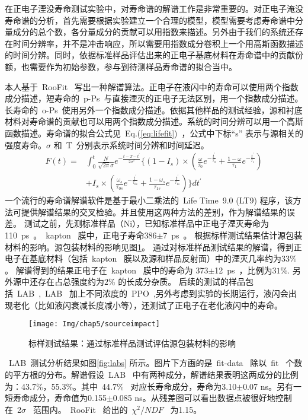 在正电子湮没寿命测试实验中，对寿命谱的解谱工作是非常重要的。对正电子淹没寿命谱的分析，首先需要根据实验建立一个合理的模型，模型需要考虑寿命谱中分量成分的总个数，各分量成分的贡献可以用指数来描述。另外由于我们的系统还存在时间分辨率，并不是冲击响应，所以需要用指数成分卷积上一个用高斯函数描述的时间分辨。同时，依据标准样品评估出来的正电子基底材料在寿命谱中的贡献份额，也需要作为初始参数，参与到待测样品寿命谱的拟合当中。

本人基于~RooFit~ 写出一种解谱算法。正电子在液闪中的寿命可以使用两个指数成分描述，短寿命的~p-Ps~与直接湮灭的正电子无法区别，用一个指数成分描述。长寿命的~o-Ps~使用另外一个指数成分描述。依据其他样品的测试经验，源和衬底材料对寿命谱的贡献也可以用两个指数成分描述。系统的时间分辨可以用一个高斯函数描述。寿命谱的拟合公式见~Eq.(\ref{eq:lifefit})~，公式中下标``s'' 表示与源相关的强度寿命。$\sigma$ 和~T~分别表示系统时间分辨和时间延迟。
\begin{eqnarray}
\label{eq:lifefit}
 F(t)=&\int_{0}^{t}\frac{N}{\sqrt{2\pi}\sigma}e^{-\frac{t-T-t^{\prime}}{2\sigma^2}}
\Big\{
     (1-I_s)\times (
    \frac{\omega}{\tau_{0}}e^{-\frac{t^{\prime}}{\tau_{0}}}+
    \frac{1-\omega}{\tau_{1}}e^{-\frac{t^{\prime}}{\tau_{1}}}
     )
 \nonumber \\
      &+I_s \times (
    \frac{\omega_s}{\tau_{0s}}e^{-\frac{t^{\prime}}{\tau_{0s}}}+
    \frac{1-\omega_s}{\tau_{1s}}e^{-\frac{t^{\prime}}{\tau_{1s}}}
     )
 \Big\}
 dt^{\prime}
\end{eqnarray}
一个流行的寿命谱解谱软件是基于最小二乘法的~Life Time~9.0 (LT9) 程序\citep{kansy1996microcomputer}，该方法可提供解谱结果的交叉检验。并且使用这两种方法的差别，作为解谱结果的误差。
测试之前，先测标准样品（Ni），已知标准样品中正电子湮灭寿命为110~ps~\citep{zhang2015accurate}。~kapton~ 膜中，正电子寿命386$\pm$7~ps~\citep{plotkowski1988positron}。 根据标样测试结果估计源包装材料的影响。源包装材料的影响见图\ref{fig:p55}。 通过对标准样品测试结果的解谱，得到正电子在基底材料（包括~kapton~ 膜以及源和样品反射面）中的湮灭几率约为$33\%$。 解谱得到的结果正电子在~kapton~ 膜中的寿命为 373$\pm$12~ps~，比例为$31\%$. 另外源中还存在占总强度约为$2\%$ 的长成分杂质。
后续的测试的样品包括~LAB~,~LAB~ 加上不同浓度的~PPO~,另外考虑到实验的长期运行，液闪会出现老化（比如液闪衰减长度减小等），还测试了正电子在老化液闪中的寿命。
\begin{figure}[!htbp]
  \centering
   \texttt{[image: Img/chap5/sourceimpact]}
    \caption{标样测试结果：通过标准样品测试评估源包装材料的影响}
  \label{fig:p55}
\end{figure}
~LAB~测试分析结果如图\ref{fig:labs} 所示。图片下方画的是~fit-data~ 除以~fit~ 个数的平方根的分布。解谱假设~LAB~ 中有两种成分，解谱结果表明这两成分的比例为：43.7\%，55.3\%。其中~44.7\%~ 对应长寿命成分，寿命为3.10$\pm$0.07 ns。另有一短寿命成分，寿命值为0.155$\pm$0.085 ns。从残差图可以看出数据点被很好地控制在~2$\sigma$~ 范围内。~RooFit~ 给出的~$\chi^{2}/NDF$~ 为1.15。
